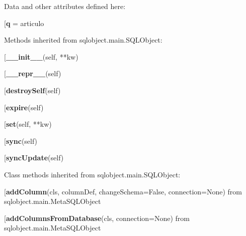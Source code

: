 Data and other attributes defined here:\\
\begin{description}\item[{\bf q} = articulo\end{description}


Methods inherited from sqlobject.main.SQLObject:\\
\begin{description}\item[{\bf \_\_init\_\_}(self, **kw)\end{description}

\begin{description}\item[{\bf \_\_repr\_\_}(self)\end{description}

\begin{description}\item[{\bf destroySelf}(self)\end{description}

\begin{description}\item[{\bf expire}(self)\end{description}

\begin{description}\item[{\bf set}(self, **kw)\end{description}

\begin{description}\item[{\bf sync}(self)\end{description}

\begin{description}\item[{\bf syncUpdate}(self)\end{description}


Class methods inherited from sqlobject.main.SQLObject:\\
\begin{description}\item[{\bf addColumn}(cls, columnDef, changeSchema=False, connection=None) from sqlobject.main.MetaSQLObject\end{description}

\begin{description}\item[{\bf addColumnsFromDatabase}(cls, connection=None) from sqlobject.main.MetaSQLObject\end{description}

